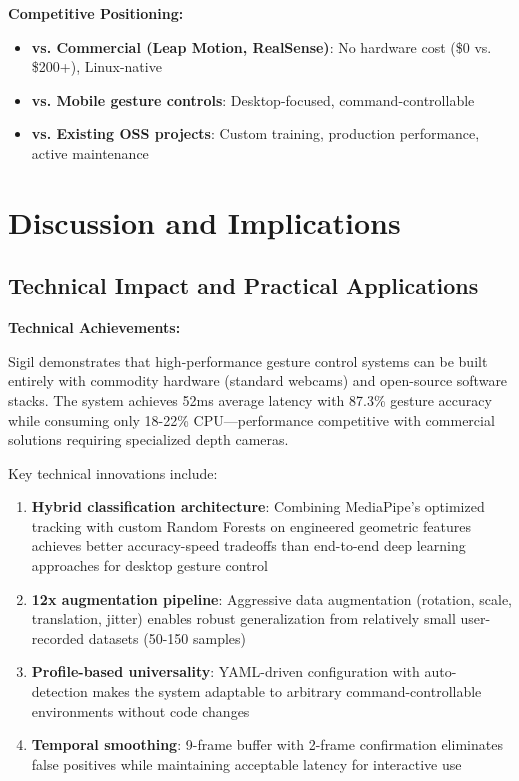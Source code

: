 \documentclass[11pt,a4paper]{article}
\begin{document}
\textbf{Competitive Positioning:}
\begin{itemize}
\item \textbf{vs. Commercial (Leap Motion, RealSense)}: No hardware cost (\$0 vs. \$200+), Linux-native
\item \textbf{vs. Mobile gesture controls}: Desktop-focused, command-controllable
\item \textbf{vs. Existing OSS projects}: Custom training, production performance, active maintenance
\end{itemize}

\section{Discussion and Implications}

\subsection{Technical Impact and Practical Applications}

\textbf{Technical Achievements:}

Sigil demonstrates that high-performance gesture control systems can be built entirely with commodity hardware (standard webcams) and open-source software stacks. The system achieves 52ms average latency with 87.3\% gesture accuracy while consuming only 18-22\% CPU—performance competitive with commercial solutions requiring specialized depth cameras.

Key technical innovations include:
\begin{enumerate}
\item \textbf{Hybrid classification architecture}: Combining MediaPipe's optimized tracking with custom Random Forests on engineered geometric features achieves better accuracy-speed tradeoffs than end-to-end deep learning approaches for desktop gesture control
\item \textbf{12x augmentation pipeline}: Aggressive data augmentation (rotation, scale, translation, jitter) enables robust generalization from relatively small user-recorded datasets (50-150 samples)
\item \textbf{Profile-based universality}: YAML-driven configuration with auto-detection makes the system adaptable to arbitrary command-controllable environments without code changes
\item \textbf{Temporal smoothing}: 9-frame buffer with 2-frame confirmation eliminates false positives while maintaining acceptable latency for interactive use
\end{enumerate}
\end{document}
